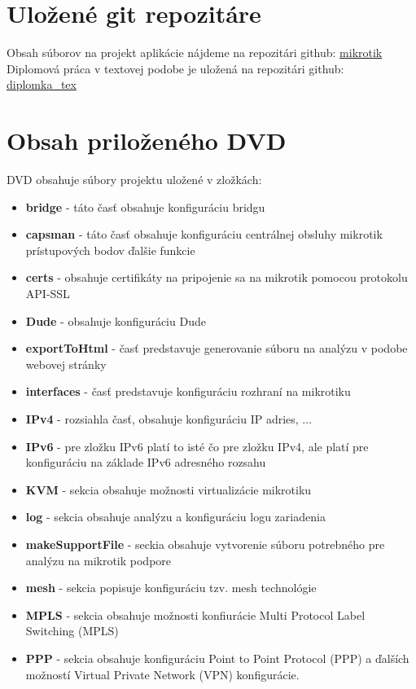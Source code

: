 \section{Uložené git repozitáre}
Obsah súborov na projekt aplikácie nájdeme na repozitári github: \href{//github.com/adiosko/mikrotik/tree/adrian}{mikrotik}\\
Diplomová práca v textovej podobe je uložená na repozitári github: \href{https://github.com/adiosko/tex_diplomka_mikrotik/tree/adrian}{diplomka_tex}
\section{Obsah priloženého DVD}
DVD obsahuje súbory projektu uložené v zložkách:
\begin{itemize}
\item \textbf{bridge} - táto časť obsahuje konfiguráciu bridgu
\item  \textbf{capsman} - táto časť obsahuje konfiguráciu centrálnej obsluhy mikrotik prístupových bodov  ďalšie funkcie
\item \textbf{certs} - obsahuje certifikáty na pripojenie sa na mikrotik pomocou protokolu API-SSL
\item \textbf{Dude} - obsahuje konfiguráciu Dude
\item \textbf{exportToHtml} - časť predstavuje generovanie súboru na analýzu v podobe webovej stránky
\item \textbf{interfaces} - časť predstavuje konfiguráciu rozhraní na mikrotiku
\item \textbf{IPv4} - rozsiahla časť, obsahuje konfiguráciu IP adries, ...
\item \textbf{IPv6} - pre zložku IPv6 platí to isté čo pre zložku IPv4, ale platí pre konfiguráciu na základe IPv6 adresného rozsahu
\item \textbf{KVM} - sekcia obsahuje možnosti virtualizácie mikrotiku
\item \textbf{log} - sekcia obsahuje analýzu a konfiguráciu logu zariadenia
\item \textbf{makeSupportFile} - seckia obsahuje vytvorenie súboru potrebného pre analýzu na mikrotik podpore
\item \textbf{mesh} - sekcia popisuje konfiguráciu tzv. mesh technológie
\item \textbf{MPLS} - sekcia obsahuje možnosti konfiurácie Multi Protocol Label Switching (MPLS)
\item \textbf{PPP} - sekcia obsahuje konfiguráciu Point to Point Protocol (PPP) a ďalších možností Virtual Private Network (VPN) konfigurácie.

\end{itemize}
